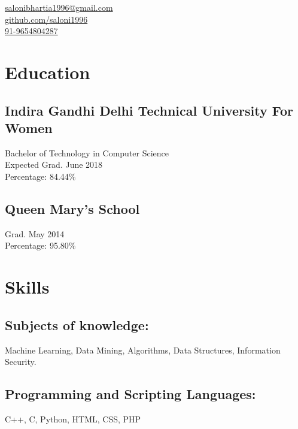 \documentclass[]{hieudo-build}
\begin{document}
{
	\faEnvelope \href{mailto:salonibhartia1996@gmail.com}{ salonibhartia1996@gmail.com}\\
	\faGithub \href{https://github.com/saloni1996}{ github.com/saloni1996}\\
	\faPhone  \href{}{91-9654804287}
}
\begin{minipage}[t]{0.3\textwidth} 

\section{Education} 

\subsection[Indira Gandhi Delhi Technical University For Women]{Indira Gandhi Delhi Technical University For Women}
Bachelor of Technology in Computer Science \\
Expected Grad. June 2018 \\
Percentage: 84.44\% \\
\sectionsep

\subsection{Queen Mary's School}
Grad. May 2014  
\\ Percentage: 95.80\%
\sectionsep

\section{Skills}
\subsection[Subjects]{Subjects of knowledge:}
Machine Learning, Data Mining, Algorithms, Data Structures, Information Security.

\subsection[Languages]{Programming and Scripting Languages:}
C++, C, Python, HTML, CSS, PHP\\ 


\end{minipage}
\end{document}
